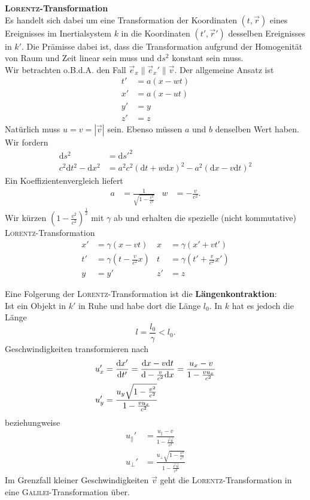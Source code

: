 \textbf{\textsc{Lorentz}-Transformation}\\

Es handelt sich dabei um eine Transformation der Koordinaten $(t,\vec{r})$ eines Ereignisses im Inertialsystem $k$ in die Koordinaten $(t',\vec{r}')$ desselben Ereignisses in $k'$. Die Prämisse dabei ist, dass die Transformation aufgrund der Homogenität von Raum und Zeit linear sein muss und $\mathrm{d}s^2$ konstant sein muss. \\
Wir betrachten o.B.d.A. den Fall $\vec{e}_x\parallel\vec{e}_x'\parallel\vec{v}$. Der allgemeine Ansatz ist
\begin{align*}
t'&=a(x-wt)\\
x'&=a(x-ut)\\
y'&=y\\
z'&=z
\end{align*}
Natürlich muss $u=v=|\vec{v}|$ sein. Ebenso müssen $a$ und $b$ denselben Wert haben. Wir fordern
\begin{align*}
\mathrm{d}s^2 &=\mathrm{d}s'^2\\
c^2\mathrm{d}t^2-\mathrm{d}x^2 &=a^2c^2(\mathrm{d}t+w\mathrm{d}x)^2 - a^2(\mathrm{d}x-v\mathrm{d}t)^2
\end{align*}
Ein Koeffizientenvergleich liefert 
\begin{align*}
a&=\frac{1}{\sqrt{1-\frac{v^2}{c^2}}} & w&=-\frac{v}{c^2}.
\end{align*}
Wir kürzen $(1-\frac{v^2}{c^2})^{\frac{1}{2}}$ mit $\gamma$ ab und erhalten die spezielle (nicht kommutative) \textsc{Lorentz}-Transformation
\begin{align*}
x'&=\gamma(x-vt) & x &=\gamma(x'+vt')\\
t'&=\gamma\left(t-\frac{v}{c^2}x\right) & t &=\gamma\left(t'+\frac{v}{c^2}x'\right)\\
y &=y'   & z' &=z
\end{align*}

Eine Folgerung der \textsc{Lorentz}-Transformation ist die \textbf{Längenkontraktion}:\\
Ist ein Objekt in $k'$ in Ruhe und habe dort die Länge $l_0$. In $k$ hat es jedoch die Länge
\begin{equation*}
l = \frac{l_0}{\gamma} < l_0.
\end{equation*}
Geschwindigkeiten transformieren nach
\begin{align*}
u_x' &= \frac{\mathrm{d}{x'}}{\mathrm{d}{t'}}=\frac{\mathrm{d}x-v\mathrm{d}t}{\mathrm{d}-\frac{v}{c^2}\mathrm{d}x}=\frac{u_x-v}{1-\frac{vu_x}{c^2}}\\
u_y' &=\frac{u_y\sqrt{1-\frac{v^2}{c^2}}}{1-\frac{vu_x}{c^2}}
\end{align*}
beziehungweise
\begin{align*}
u_\parallel' &=\frac{u_\parallel-v}{1-\frac{\vec{v}\vec{u}}{c^2}}\\
u_\perp' &= \frac{u_\perp\sqrt{1-\frac{v^2}{c^2}}}{1-\frac{\vec{v}\vec{u}}{c^2}}
\end{align*}
Im Grenzfall kleiner Geschwindigkeiten $\vec{v}$ geht die \textsc{Lorentz}-Transformation in eine \textsc{Galilei}-Transformation über.

